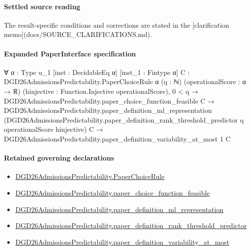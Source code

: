\documentclass[10pt]{article}
\begin{document}
\paragraph{Settled source reading}
The result-\allowbreak{}specific conditions and corrections are stated in the [clarification memo](docs/\allowbreak{}SOURCE\_\allowbreak{}CLARIFICATIONS.\allowbreak{}md).\allowbreak{}

\paragraph{Expanded PaperInterface specification}
\begin{ReviewVerbatim}
∀ {α : Type u_1} [inst : DecidableEq α] [inst_1 : Fintype α] {C : DGD26AdmissionsPredictability.PaperChoiceRule α}
  (q : ℕ) (operationalScore : α → ℝ) (hinjective : Function.Injective operationalScore),
  0 < q →
    DGD26AdmissionsPredictability.paper_choice_function_feasible C →
      DGD26AdmissionsPredictability.paper_definition_ml_representation
          (DGD26AdmissionsPredictability.paper_definition_rank_threshold_predictor q operationalScore hinjective) C →
        DGD26AdmissionsPredictability.paper_definition_variability_at_most 1 C
\end{ReviewVerbatim}

\paragraph{Retained governing declarations}
\begin{itemize}\raggedright
\item \hyperlink{governing-declaration-4678951b4432b184}{DGD26\allowbreak{}Admissions\allowbreak{}Predictability.\allowbreak{}Paper\allowbreak{}Choice\allowbreak{}Rule}
\item \hyperlink{governing-declaration-f7de74a44053f6d5}{DGD26\allowbreak{}Admissions\allowbreak{}Predictability.\allowbreak{}paper\_\allowbreak{}choice\_\allowbreak{}function\_\allowbreak{}feasible}
\item \hyperlink{governing-declaration-6f1fddfd896a577f}{DGD26\allowbreak{}Admissions\allowbreak{}Predictability.\allowbreak{}paper\_\allowbreak{}definition\_\allowbreak{}ml\_\allowbreak{}representation}
\item \hyperlink{governing-declaration-302cb3b60c7e48b6}{DGD26\allowbreak{}Admissions\allowbreak{}Predictability.\allowbreak{}paper\_\allowbreak{}definition\_\allowbreak{}rank\_\allowbreak{}threshold\_\allowbreak{}predictor}
\item \hyperlink{governing-declaration-e5ed62be2897e9e6}{DGD26\allowbreak{}Admissions\allowbreak{}Predictability.\allowbreak{}paper\_\allowbreak{}definition\_\allowbreak{}variability\_\allowbreak{}at\_\allowbreak{}most}
\end{itemize}
\end{document}

